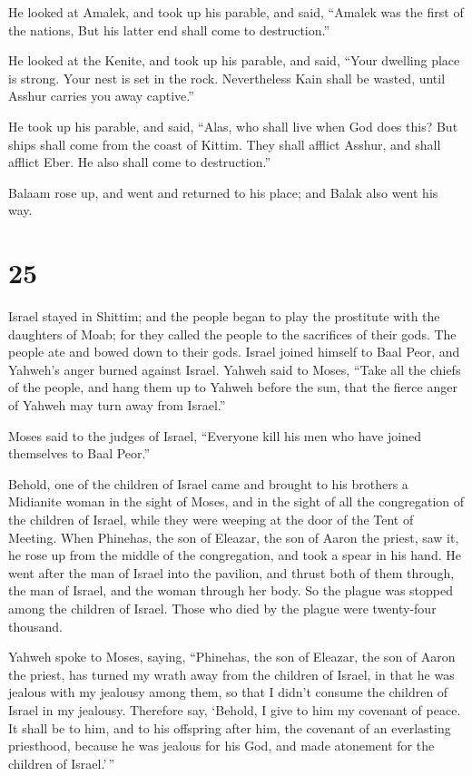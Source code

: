  He looked at Amalek, and took up his parable, and said,
``Amalek was the first of the nations, But his latter end shall come to
destruction.''

 He looked at the Kenite, and took up his parable, and
said, ``Your dwelling place is strong. Your nest is set in the rock.
 Nevertheless Kain shall be wasted, until Asshur carries
you away captive.''

 He took up his parable, and said, ``Alas, who shall live
when God does this?  But ships shall come from the coast of
Kittim. They shall afflict Asshur, and shall afflict Eber. He also shall
come to destruction.''

 Balaam rose up, and went and returned to his place; and
Balak also went his way.

\hypertarget{section-24}{%
\section{25}\label{section-24}}

 Israel stayed in Shittim; and the people began to play the
prostitute with the daughters of Moab;  for they called the
people to the sacrifices of their gods. The people ate and bowed down to
their gods.  Israel joined himself to Baal Peor, and
Yahweh's anger burned against Israel.  Yahweh said to Moses,
``Take all the chiefs of the people, and hang them up to Yahweh before
the sun, that the fierce anger of Yahweh may turn away from Israel.''

 Moses said to the judges of Israel, ``Everyone kill his men
who have joined themselves to Baal Peor.''

 Behold, one of the children of Israel came and brought to
his brothers a Midianite woman in the sight of Moses, and in the sight
of all the congregation of the children of Israel, while they were
weeping at the door of the Tent of Meeting.  When Phinehas,
the son of Eleazar, the son of Aaron the priest, saw it, he rose up from
the middle of the congregation, and took a spear in his hand.
 He went after the man of Israel into the pavilion, and
thrust both of them through, the man of Israel, and the woman through
her body. So the plague was stopped among the children of Israel.
 Those who died by the plague were twenty-four thousand.

 Yahweh spoke to Moses, saying,  ``Phinehas,
the son of Eleazar, the son of Aaron the priest, has turned my wrath
away from the children of Israel, in that he was jealous with my
jealousy among them, so that I didn't consume the children of Israel in
my jealousy.  Therefore say, `Behold, I give to him my
covenant of peace.  It shall be to him, and to his
offspring after him, the covenant of an everlasting priesthood, because
he was jealous for his God, and made atonement for the children of
Israel.'\,''

